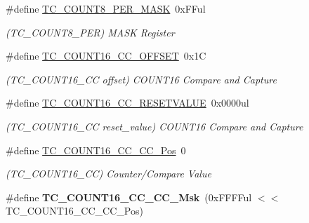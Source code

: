 \begin{DoxyCompactItemize}
\item 
\hypertarget{group___s_a_m_l21___t_c_ga0763664a0144b7df6771680d972cd4ee}{}\#define \hyperlink{group___s_a_m_l21___t_c_ga0763664a0144b7df6771680d972cd4ee}{T\+C\+\_\+\+C\+O\+U\+N\+T8\+\_\+\+P\+E\+R\+\_\+\+M\+A\+S\+K}~0x\+F\+Ful\label{group___s_a_m_l21___t_c_ga0763664a0144b7df6771680d972cd4ee}

\begin{DoxyCompactList}\small\item\em (T\+C\+\_\+\+C\+O\+U\+N\+T8\+\_\+\+P\+E\+R) M\+A\+S\+K Register \end{DoxyCompactList}\item 
\hypertarget{group___s_a_m_l21___t_c_ga80da31d33dd890e365c683326433eef0}{}\#define \hyperlink{group___s_a_m_l21___t_c_ga80da31d33dd890e365c683326433eef0}{T\+C\+\_\+\+C\+O\+U\+N\+T16\+\_\+\+C\+C\+\_\+\+O\+F\+F\+S\+E\+T}~0x1\+C\label{group___s_a_m_l21___t_c_ga80da31d33dd890e365c683326433eef0}

\begin{DoxyCompactList}\small\item\em (T\+C\+\_\+\+C\+O\+U\+N\+T16\+\_\+\+C\+C offset) C\+O\+U\+N\+T16 Compare and Capture \end{DoxyCompactList}\item 
\hypertarget{group___s_a_m_l21___t_c_gac53fda09c4ea6e1bcce4b649f5d9873c}{}\#define \hyperlink{group___s_a_m_l21___t_c_gac53fda09c4ea6e1bcce4b649f5d9873c}{T\+C\+\_\+\+C\+O\+U\+N\+T16\+\_\+\+C\+C\+\_\+\+R\+E\+S\+E\+T\+V\+A\+L\+U\+E}~0x0000ul\label{group___s_a_m_l21___t_c_gac53fda09c4ea6e1bcce4b649f5d9873c}

\begin{DoxyCompactList}\small\item\em (T\+C\+\_\+\+C\+O\+U\+N\+T16\+\_\+\+C\+C reset\+\_\+value) C\+O\+U\+N\+T16 Compare and Capture \end{DoxyCompactList}\item 
\hypertarget{group___s_a_m_l21___t_c_ga5412aca6343897cc3c3b5cf4b325b30f}{}\#define \hyperlink{group___s_a_m_l21___t_c_ga5412aca6343897cc3c3b5cf4b325b30f}{T\+C\+\_\+\+C\+O\+U\+N\+T16\+\_\+\+C\+C\+\_\+\+C\+C\+\_\+\+Pos}~0\label{group___s_a_m_l21___t_c_ga5412aca6343897cc3c3b5cf4b325b30f}

\begin{DoxyCompactList}\small\item\em (T\+C\+\_\+\+C\+O\+U\+N\+T16\+\_\+\+C\+C) Counter/\+Compare Value \end{DoxyCompactList}\item 
\hypertarget{group___s_a_m_l21___t_c_ga32e15c2dca1fdf6c20086a9b0754a78d}{}\#define {\bfseries T\+C\+\_\+\+C\+O\+U\+N\+T16\+\_\+\+C\+C\+\_\+\+C\+C\+\_\+\+Msk}~(0x\+F\+F\+F\+Ful $<$$<$ T\+C\+\_\+\+C\+O\+U\+N\+T16\+\_\+\+C\+C\+\_\+\+C\+C\+\_\+\+Pos)\label{group___s_a_m_l21___t_c_ga32e15c2dca1fdf6c20086a9b0754a78d}


\end{DoxyCompactItemize}
